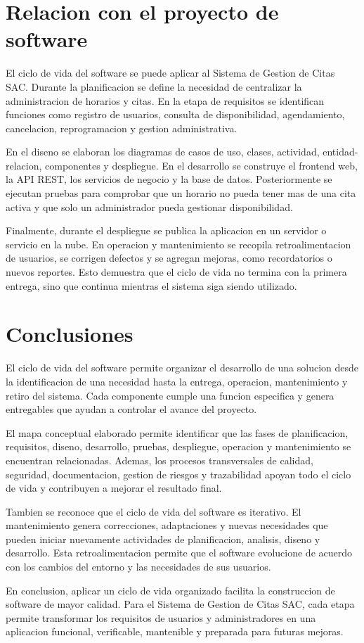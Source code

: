 \documentclass[12pt,letterpaper]{article}
\begin{document}
\section{Relacion con el proyecto de software}

El ciclo de vida del software se puede aplicar al Sistema de Gestion de Citas SAC. Durante la planificacion se define la necesidad de centralizar la administracion de horarios y citas. En la etapa de requisitos se identifican funciones como registro de usuarios, consulta de disponibilidad, agendamiento, cancelacion, reprogramacion y gestion administrativa.

En el diseno se elaboran los diagramas de casos de uso, clases, actividad, entidad-relacion, componentes y despliegue. En el desarrollo se construye el frontend web, la API REST, los servicios de negocio y la base de datos. Posteriormente se ejecutan pruebas para comprobar que un horario no pueda tener mas de una cita activa y que solo un administrador pueda gestionar disponibilidad.

Finalmente, durante el despliegue se publica la aplicacion en un servidor o servicio en la nube. En operacion y mantenimiento se recopila retroalimentacion de usuarios, se corrigen defectos y se agregan mejoras, como recordatorios o nuevos reportes. Esto demuestra que el ciclo de vida no termina con la primera entrega, sino que continua mientras el sistema siga siendo utilizado.

\section{Conclusiones}

El ciclo de vida del software permite organizar el desarrollo de una solucion desde la identificacion de una necesidad hasta la entrega, operacion, mantenimiento y retiro del sistema. Cada componente cumple una funcion especifica y genera entregables que ayudan a controlar el avance del proyecto.

El mapa conceptual elaborado permite identificar que las fases de planificacion, requisitos, diseno, desarrollo, pruebas, despliegue, operacion y mantenimiento se encuentran relacionadas. Ademas, los procesos transversales de calidad, seguridad, documentacion, gestion de riesgos y trazabilidad apoyan todo el ciclo de vida y contribuyen a mejorar el resultado final.

Tambien se reconoce que el ciclo de vida del software es iterativo. El mantenimiento genera correcciones, adaptaciones y nuevas necesidades que pueden iniciar nuevamente actividades de planificacion, analisis, diseno y desarrollo. Esta retroalimentacion permite que el software evolucione de acuerdo con los cambios del entorno y las necesidades de sus usuarios.

En conclusion, aplicar un ciclo de vida organizado facilita la construccion de software de mayor calidad. Para el Sistema de Gestion de Citas SAC, cada etapa permite transformar los requisitos de usuarios y administradores en una aplicacion funcional, verificable, mantenible y preparada para futuras mejoras.
\end{document}

